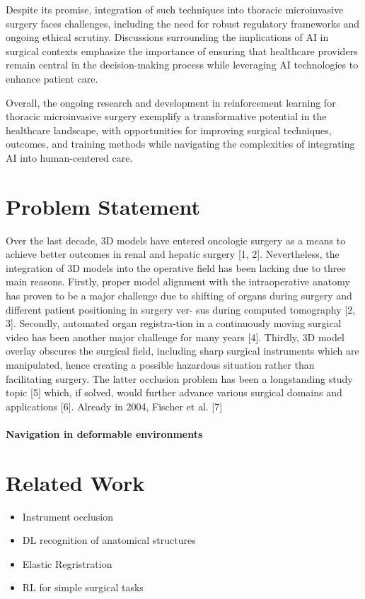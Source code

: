 \documentclass[a4paper,11pt]{report}
\theoremstyle{definition}
\theoremstyle{plain}
\theoremstyle{remark}  %
\begin{document}
Despite its promise, integration of such techniques into thoracic microinvasive surgery faces 
challenges, including the need for robust regulatory frameworks and ongoing ethical scrutiny. 
Discussions surrounding the implications of AI in surgical contexts emphasize the importance of 
ensuring that healthcare providers remain central in the decision-making process while leveraging AI 
technologies to enhance patient care.

Overall, the ongoing research and development in reinforcement learning for thoracic microinvasive 
surgery exemplify a transformative potential in the healthcare landscape, with opportunities for 
improving surgical techniques, outcomes, and training methods while navigating the complexities 
of integrating AI into human-centered care.

\section{Problem Statement}
Over the last decade, 3D models have entered oncologic surgery
as a means to achieve better outcomes in renal and hepatic
surgery [1, 2]. Nevertheless, the integration of 3D models into
the operative field has been lacking due to three main reasons.
Firstly, proper model alignment with the intraoperative anatomy
has proven to be a major challenge due to shifting of organs
during surgery and different patient positioning in surgery ver-
sus during computed tomography [2, 3]. Secondly, automated
organ registra-tion in a continuously moving surgical video
has been another major challenge for many years [4]. Thirdly,
3D model overlay obscures the surgical field, including sharp
surgical instruments which are manipulated, hence creating a
possible hazardous situation rather than facilitating surgery. The
latter occlusion problem has been a longstanding study topic
[5] which, if solved, would further advance various surgical
domains and applications [6]. Already in 2004, Fischer et al. [7]

\paragraph{Navigation in deformable environments}
\section{Related Work}
\begin{itemize}
    \item Instrument occlusion
    \item DL recognition of anatomical structures
    \item Elastic Regristration
    \item RL for simple surgical tasks
\end{itemize}
\end{document}
